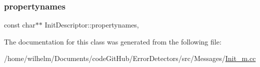 \subsubsection{\texorpdfstring{propertynames}{propertynames}}
{\footnotesize\ttfamily const char$\ast$$\ast$ Init\+Descriptor\+::propertynames\hspace{0.3cm}{\ttfamily [mutable]}, {\ttfamily [private]}}



The documentation for this class was generated from the following file\+:\begin{DoxyCompactItemize}
\item 
/home/wilhelm/\+Documents/code\+Git\+Hub/\+Error\+Detectors/src/\+Messages/\hyperlink{_init__m_8cc}{Init\+\_\+m.\+cc}\end{DoxyCompactItemize}
